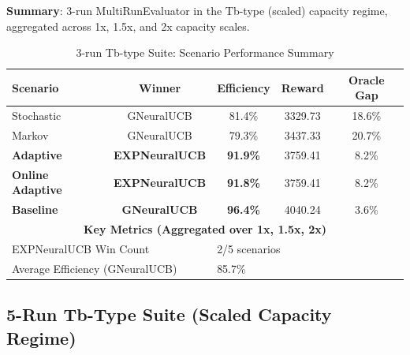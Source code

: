 \documentclass[11pt,a4paper]{article}
\newcommand{\success}[1]{\textcolor{successcolor}{\textbf{#1}}}
\begin{document}
\begin{tcolorbox}[colback=criticalcolor!10,colframe=criticalcolor]

\textbf{Summary}: 3-run MultiRunEvaluator in the Tb-type (scaled) capacity regime, aggregated across 1x, 1.5x, and 2x capacity scales.

\begin{table}[H]
\centering
\caption{3-run Tb-type Suite: Scenario Performance Summary}
\begin{tabular}{|l|c|c|c|c|}
\hline
\textbf{Scenario} & \textbf{Winner} & \textbf{Efficiency} & \textbf{Reward} & \textbf{Oracle Gap} \\
\hline
\hline
Stochastic      & GNeuralUCB                & 81.4\% & 3329.73 & 18.6\% \\
Markov          & GNeuralUCB                & 79.3\% & 3437.33 & 20.7\% \\
\success{Adaptive}        & \success{EXPNeuralUCB} & \success{91.9\%} & 3759.41 & 8.2\% \\
\success{Online Adaptive} & \success{EXPNeuralUCB} & \success{91.8\%} & 3759.41 & 8.2\% \\
\success{Baseline}        & \success{GNeuralUCB}   & \success{96.4\%} & 4040.24 & 3.6\% \\
\hline
\multicolumn{5}{|c|}{\textbf{Key Metrics (Aggregated over 1x, 1.5x, 2x)}} \\
\hline
\multicolumn{2}{|l|}{EXPNeuralUCB Win Count} & \multicolumn{3}{|l|}{2/5 scenarios} \\
\multicolumn{2}{|l|}{Average Efficiency (GNeuralUCB)} & \multicolumn{3}{|l|}{85.7\%} \\
\hline
\end{tabular}
\end{table}

\end{tcolorbox}

\subsection{5-Run Tb-Type Suite (Scaled Capacity Regime)}
\end{document}
